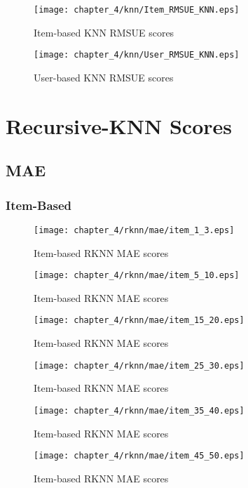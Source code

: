 \begin{figure}[H]
\centering
\texttt{[image: chapter\_4/knn/Item\_RMSUE\_KNN.eps]}
\caption{Item-based KNN RMSUE scores}
\end{figure}

\begin{figure}[H]
\centering
\texttt{[image: chapter\_4/knn/User\_RMSUE\_KNN.eps]}
\caption{User-based KNN RMSUE scores}
\end{figure}

\section{Recursive-KNN Scores}

\subsection{MAE}

\subsubsection{Item-Based}

\begin{figure}[H]
\centering
\texttt{[image: chapter\_4/rknn/mae/item\_1\_3.eps]}
\caption{Item-based RKNN MAE scores}
\end{figure}

\begin{figure}[H]
\centering
\texttt{[image: chapter\_4/rknn/mae/item\_5\_10.eps]}
\caption{Item-based RKNN MAE scores}
\end{figure}

\begin{figure}[H]
\centering
\texttt{[image: chapter\_4/rknn/mae/item\_15\_20.eps]}
\caption{Item-based RKNN MAE scores}
\end{figure}

\begin{figure}[H]
\centering
\texttt{[image: chapter\_4/rknn/mae/item\_25\_30.eps]}
\caption{Item-based RKNN MAE scores}
\end{figure}

\begin{figure}[H]
\centering
\texttt{[image: chapter\_4/rknn/mae/item\_35\_40.eps]}
\caption{Item-based RKNN MAE scores}
\end{figure}

\begin{figure}[H]
\centering
\texttt{[image: chapter\_4/rknn/mae/item\_45\_50.eps]}
\caption{Item-based RKNN MAE scores}
\end{figure}

